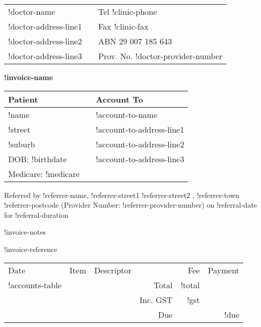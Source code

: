 \documentclass[12pt]{article}
\begin{document}
\begin{center}
\begin{tabular}{p{}>{\centering}p{}<{\centering}p{}<{\raggedleft}}
!doctor-name &  & Tel !clinic-phone \\
!doctor-address-line1 &  & Fax !clinic-fax \\
!doctor-address-line2 & & ABN 29 007 185 643 \\
!doctor-address-line3 & & Prov. No. !doctor-provider-number\\ 
\hline
\end{tabular}

\vspace{7mm}

{ \Large \textbf{!invoice-name} }

\end{center}

\vspace{4mm}


\begin{tabular}{lp{5mm}l} 
Patient & & Account To\\ \midrule
!name & & !account-to-name \\
!street & & !account-to-address-line1 \\
!suburb & & !account-to-address-line2 \\
DOB: !birthdate &  & !account-to-address-line3 \\
Medicare:   !medicare & &   \\
\end{tabular}

\vspace{3mm}

Referred by !referrer-name, !referrer-street1 !referrer-street2 ,
!referrer-town !referrer-postcode (Provider Number: !referrer-provider-number)
on !referral-date for !referral-duration

\vspace{3mm}

!invoice-notes

!invoice-reference

\vspace{3mm}

\begin{tabularx}{\textwidth}{llp{55mm}rrr}
Date & Item & Descriptor & & Fee & Payment \\ \cmidrule(l){1-6}
!accounts-table
\cmidrule(l){5-6}
& & & Total & !total  & \\
& & & Inc. GST & !gst & \\ \cmidrule(l){5-6}
& & & Due & & !due \\

\end{tabularx}
\end{document}
